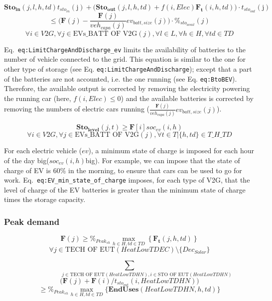 \documentclass[
]{article}
\begin{document}
{\[\textbf{Sto}_\textbf{in} (j,l,h,td)t_{sto_{in}}(\text{j}) + \Big(\textbf{Sto}_\textbf{out}(j,l,h,td) + f(i,Elec) \textbf{F}_\textbf{t} (i,h,td) \Big) \cdot t_{sto_{out}}(\text{j})\]\[\leq \Big( \textbf{F} (j) - \frac{\textbf{F} (j)}{ veh_{capa} (j)} ev_{batt,size} (j) \Big) \cdot \%_{sto_{avail}}(j)\]\[\forall i \in V2G , \forall j \in \text{EVs\_BATT OF V2G}(j) , \forall l \in L, \forall h \in H, \forall td \in TD\]}

Eq.~\texttt{eq:LimitChargeAndDischarge\_ev} limits the availability of
batteries to the number of vehicle connected to the grid. This equation
is similar to the one for other type of storage (see Eq.
\texttt{eq:LimitChargeAndDischarge}); except that a part of the
batteries are not accounted, i.e. the one running (see Eq.
\texttt{eq:BtoBEV}). Therefore, the available output is corrected by
removing the electricity powering the running car (here,
\(f(i,Elec) \leq 0\)) and the available batteries is corrected by
removing the numbers of electric cars running
(\(\frac{\textbf{F} (j)}{ veh_{capa} (j)} ev_{batt,size} (j)\)).

{\[\textbf{Sto}_\textbf{level} (j,t) \geq \textbf{F}[i] soc_{ev}(i,h)\]\[\forall i \in V2G , \forall j \in \text{EVs\_BATT OF V2G}(j) , \forall t \in T| \{h,td\} \in T\_H\_TD\]}

For each electric vehicle (\(ev\)), a minimum state of charge is imposed
for each hour of the day big(\(soc_{ev}(i,h)\)big). For example, we can
impose that the state of charge of EV is 60\% in the morning, to ensure
that cars can be used to go for work.
Eq.~\texttt{eq:EV\_min\_state\_of\_charge} imposes, for each type of
{V2G}, that the level of charge of the EV batteries is greater than the
minimum state of charge times the storage capacity.

\subsubsection{Peak demand}\label{peak-demand}

{\[\textbf{F} (j) 
\geq
\%_{Peak_{sh}}\max_{h\in H,td\in TD}\left\{\textbf{F}_\textbf{t}(j,h,td)\right\}\]\[\forall j \in \text{TECH OF  EUT} (HeatLowTDEC)   \setminus \{ Dec_{Solar}\}\]}

{\[\sum_{\hspace{3cm}j \in \text{TECH OF EUT} (HeatLowTDHN), i \in \text{STO OF EUT}(HeatLowTDHN)}\]\[\Big( \textbf{F} (j)+
\textbf{F} (i)/t_{sto_{out}}(i,HeatLowTDHN)  \Big)\]\[\geq
\%_{Peak_{sh}} \max_{h\in H,td\in TD}  \big\{ \textbf{EndUses}(HeatLowTDHN,h,td) \big\}\]}
\end{document}
